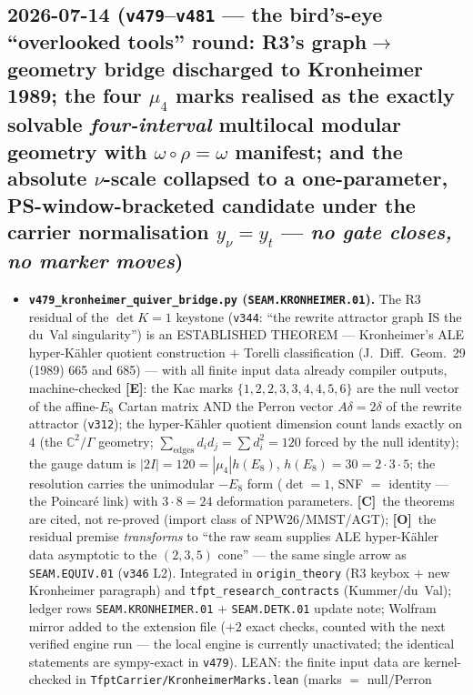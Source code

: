 \documentclass[11pt]{article}
\providecommand{\mE}{\textbf{[E]}}\providecommand{\mC}{\textbf{[C]}}
\providecommand{\mO}{\textbf{[O]}}\providecommand{\mX}{\textbf{[X]}}
\begin{document}
\subsection*{2026-07-14 (\texttt{v479}--\texttt{v481} --- the bird's-eye ``overlooked tools'' round: R3's graph$\to$geometry bridge discharged to Kronheimer 1989; the four $\mu_4$ marks realised as the exactly solvable \emph{four-interval} multilocal modular geometry with $\omega\circ\rho=\omega$ manifest; and the absolute $\nu$-scale collapsed to a one-parameter, PS-window-bracketed candidate under the carrier normalisation $y_\nu{=}y_t$ --- \emph{no gate closes, no marker moves})}
\begin{itemize}[leftmargin=1.5em]
\item \textbf{\texttt{v479\_kronheimer\_quiver\_bridge.py} (\texttt{SEAM.KRONHEIMER.01}).} The R3 residual
of the $\det K{=}1$ keystone (\texttt{v344}: ``the rewrite attractor graph IS the du~Val singularity'') is
an ESTABLISHED THEOREM --- Kronheimer's ALE hyper-K\"ahler quotient construction $+$ Torelli classification
(J.~Diff.~Geom.~29 (1989) 665 and 685) --- with all finite input data already compiler outputs, machine-checked
\mE: the Kac marks $\{1,2,2,3,3,4,4,5,6\}$ are the null vector of the affine-$E_8$ Cartan matrix AND the
Perron vector $A\delta{=}2\delta$ of the rewrite attractor (\texttt{v312}); the hyper-K\"ahler quotient
dimension count lands exactly on $4$ (the $\mathbb{C}^2/\Gamma$ geometry;
$\sum_{\mathrm{edges}}d_id_j{=}\sum d_i^2{=}120$ forced by the null identity); the gauge datum is
$|2I|{=}120{=}|\mu_4|h(E_8)$, $h(E_8){=}30{=}2\cdot3\cdot5$; the resolution carries the unimodular $-E_8$
form ($\det{=}1$, SNF $=$ identity --- the Poincar\'e link) with $3\cdot8{=}24$ deformation parameters. \mC\
the theorems are cited, not re-proved (import class of NPW26/MMST/AGT); \mO\ the residual premise
\emph{transforms} to ``the raw seam supplies ALE hyper-K\"ahler data asymptotic to the $(2,3,5)$ cone'' ---
the same single arrow as \texttt{SEAM.EQUIV.01} (\texttt{v346} L2). Integrated in \texttt{origin\_theory}
(R3 keybox $+$ new Kronheimer paragraph) and \texttt{tfpt\_research\_contracts} (Kummer/du~Val); ledger rows
\texttt{SEAM.KRONHEIMER.01} $+$ \texttt{SEAM.DETK.01} update note; Wolfram mirror added to the
extension file ($+2$ exact checks, counted with the next verified engine run --- the local engine is
currently unactivated; the identical statements are sympy-exact in \texttt{v479}). LEAN: the finite
input data are kernel-checked in \texttt{TfptCarrier/KronheimerMarks.lean} (marks $=$ null/Perron

\end{itemize}
\end{document}
